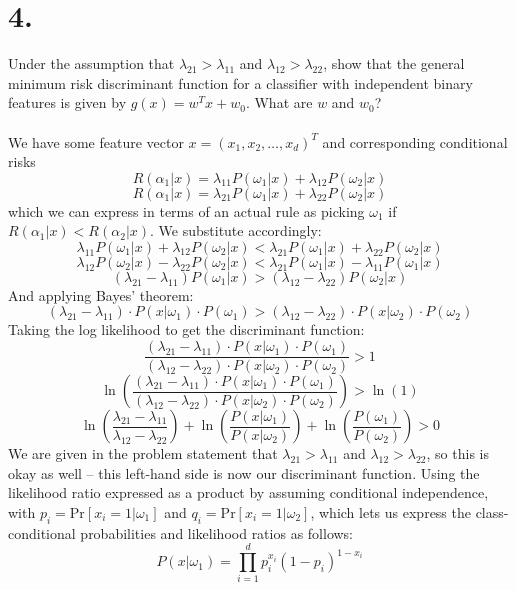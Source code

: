 \documentclass{article}
\begin{document}
{\Large 

\section*{4.}
Under the assumption that \(\lambda_{21} > \lambda_{11}\) and \(\lambda_{12} > \lambda_{22}\), show that the general minimum risk discriminant function for a classifier with independent binary features is given by \(g(x) = w^Tx + w_0\). What are \(w \) and \(w_0\)? \\ \\
We have some feature vector \(x = (x_1, x_2, \dots, x_d)^T\) and corresponding conditional risks 
\[
  R(\alpha_1 | x) = \lambda_{11} P(\omega_1 | x) + \lambda_{12} P(\omega_2 | x)
\]
\[
  R(\alpha_1 | x) = \lambda_{21} P(\omega_1 | x) + \lambda_{22} P(\omega_2 | x)
\]
which we can express in terms of an actual rule as picking \(\omega_1\) if \(R(\alpha_1 | x) < R(\alpha_2 | x)\). We substitute accordingly:
\[
  \lambda_{11} P(\omega_1 | x) + \lambda{_12} P(\omega_2 | x) < \lambda_{21} P(\omega_1 | x) + \lambda_{22} P(\omega_2 | x) 
\]
\[
  \lambda_{12} P(\omega_2 | x) - \lambda_{22} P(\omega_2 | x) < \lambda_{21} P(\omega_1 | x) - \lambda_{11} P(\omega_1 | x)
\]
\[
  (\lambda_{21} - \lambda_{11})P(\omega_1 | x) > (\lambda_{12} - \lambda_{22} )P(\omega_2 | x) 
\]
And applying Bayes' theorem: 
\[
  (\lambda_{21} - \lambda_{11}) \cdot P(x | \omega_1) \cdot P(\omega_1) > (\lambda_{12} - \lambda_{22} ) \cdot P(x | \omega_2) \cdot P(\omega_2)
\]
Taking the log likelihood to get the discriminant function:
\[
  \frac{(\lambda_{21} - \lambda_{11}) \cdot P(x | \omega_1) \cdot P(\omega_1)}{(\lambda_{12} - \lambda_{22} ) \cdot P(x | \omega_2) \cdot P(\omega_2)} > 1
\]
\[
  \ln(\frac{(\lambda_{21} - \lambda_{11}) \cdot P(x | \omega_1) \cdot P(\omega_1)}{(\lambda_{12} - \lambda_{22} ) \cdot P(x | \omega_2) \cdot P(\omega_2)}) > \ln(1)
\]
\[
  \ln(\frac{\lambda_{21} - \lambda_{11}}{\lambda_{12} - \lambda_{22}}) + \ln(\frac{P(x | \omega_1)}{P(x | \omega_2)}) + \ln(\frac{P(\omega_1)}{P(\omega_2)}) > 0
\]
We are given in the problem statement that \(\lambda_{21} > \lambda_{11}\) and \(\lambda_{12} > \lambda_{22}\), so this is okay as well -- this left-hand side is now our discriminant function. Using the likelihood ratio expressed as a product by assuming conditional independence, with \(p_i = \text{Pr}[x_i = 1 | \omega_1]\) and \(q_i = \text{Pr}[x_i = 1 | \omega_2]\), which lets us express the class-conditional probabilities and likelihood ratios as follows:
\[
  P(x | \omega_1) = \prod_{i=1}^{d} p_i^{x_i} (1-p_i)^{1-x_i}
\]}
\end{document}
